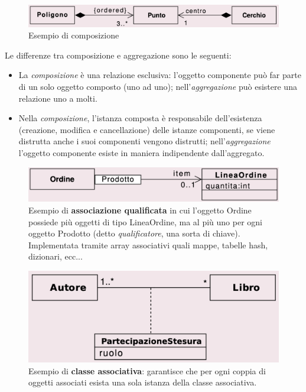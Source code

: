 \begin{figure}[h!]
    \centering
    \includegraphics[width=1\linewidth]{assets/UML/class/class-7.png}
    \caption{Esempio di composizione}
\end{figure}
Le differenze tra composizione e aggregazione sono le seguenti:
\begin{itemize}
    \item La \textit{composizione} è una relazione esclusiva: l'oggetto componente può far parte di un solo oggetto composto (uno ad uno); nell'\textit{aggregazione} può esistere una relazione uno a molti.
    \item Nella \textit{composizione}, l'istanza composta è responsabile dell'esistenza (creazione, modifica e cancellazione) delle istanze componenti, se viene distrutta anche i suoi componenti vengono distrutti; nell'\textit{aggregazione} l'oggetto componente esiste in maniera indipendente dall'aggregato.
\end{itemize}

\begin{figure}[h!]
    \centering
    \includegraphics[width=1\linewidth]{assets/UML/class/class-12.png}
    \caption{Esempio di \textbf{associazione qualificata} in cui l'oggetto Ordine possiede più oggetti di tipo LineaOrdine, ma al più uno per ogni oggetto Prodotto (detto \textit{qualificatore}, una sorta di chiave). Implementata tramite array associativi quali mappe, tabelle hash, dizionari, ecc...}
\end{figure}

\vspace{20pt}

\begin{figure}[h!]
    \centering
    \includegraphics[width=1\linewidth]{assets/UML/class/class-13.png}
    \caption{Esempio di \textbf{classe associativa}: garantisce che per ogni coppia di oggetti associati esista una sola istanza della classe associativa.}
\end{figure}

